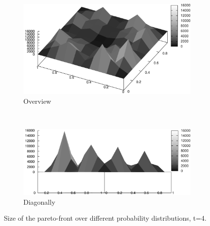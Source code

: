 \documentclass{article}
\begin{document}
	\begin{figure}
		\centering
		\begin{subfigure}[b]{0.45\textwidth}
			\centering
			\includegraphics[width=\textwidth]{images/r4_bird}
			\caption{Overview}
			\label{fig:r4_bird}
		\end{subfigure}
		~
		\begin{subfigure}[b]{0.45\textwidth}
			\centering
			\includegraphics[width=\textwidth]{images/r4_diagonal}
			\caption{Diagonally}
			\label{fig:r4_diagonal}
		\end{subfigure}
		\caption{Size of the pareto-front over different probability
		distributions, t=4.}
	\end{figure}
\end{document}
